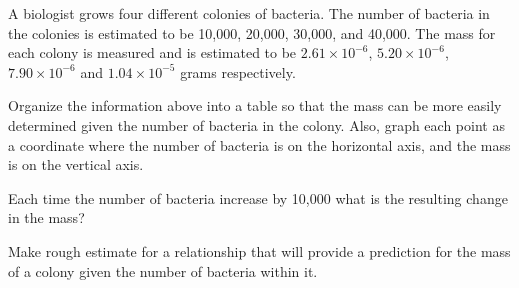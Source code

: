 
\begin{problem}
\item A biologist grows four different colonies of bacteria. The
  number of bacteria in the colonies is estimated to be 10,000,
  20,000, 30,000, and 40,000. The mass for each colony is measured and
  is estimated to be $2.61\times 10^{-6}$, $5.20\times 10^{-6}$,
  $7.90\times 10^{-6}$ and $1.04\times 10^{-5}$ grams respectively.

  Organize the information above into a table so that the mass can be
  more easily determined given the number of bacteria in the
  colony. Also, graph each point as a coordinate where the number of
  bacteria is on the horizontal axis, and the mass is on the vertical
  axis.

  \vfill

\item Each time the number of bacteria increase by 10,000 what is the
  resulting change in the mass?

  \vfill

\item Make rough estimate for a relationship that will provide a
  prediction for the mass of a colony given the number of bacteria
  within it.

  \vfill


  \vspace{5em}


\end{problem}


